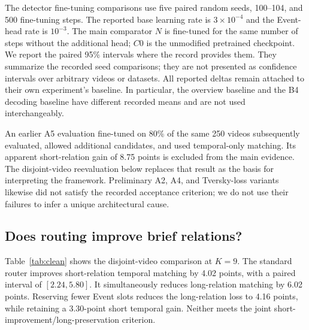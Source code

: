 \documentclass[10pt,twocolumn,letterpaper]{article}
\begin{document}
The detector fine-tuning comparisons use five paired random seeds, 100--104, and 500 fine-tuning steps. The reported base learning rate is $3\times10^{-4}$ and the Event-head rate is $10^{-3}$. The main comparator $N$ is fine-tuned for the same number of steps without the additional head; $C0$ is the unmodified pretrained checkpoint. We report the paired 95\% intervals where the record provides them. They summarize the recorded seed comparisons; they are not presented as confidence intervals over arbitrary videos or datasets. All reported deltas remain attached to their own experiment's baseline. In particular, the overview baseline and the B4 decoding baseline have different recorded means and are not used interchangeably.

An earlier A5 evaluation fine-tuned on 80\% of the same 250 videos subsequently evaluated, allowed additional candidates, and used temporal-only matching. Its apparent short-relation gain of 8.75 points is excluded from the main evidence. The disjoint-video reevaluation below replaces that result as the basis for interpreting the framework. Preliminary A2, A4, and Tversky-loss variants likewise did not satisfy the recorded acceptance criterion; we do not use their failures to infer a unique architectural cause.

\subsection{Does routing improve brief relations?}
Table~\ref{tab:clean} shows the disjoint-video comparison at $K=9$. The standard router improves short-relation temporal matching by 4.02 points, with a paired interval of $[2.24,5.80]$. It simultaneously reduces long-relation matching by 6.02 points. Reserving fewer Event slots reduces the long-relation loss to 4.16 points, while retaining a 3.30-point short temporal gain. Neither meets the joint short-improvement/long-preservation criterion.
\end{document}
